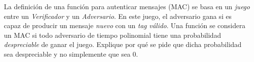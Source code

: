 La definición de una función para autenticar mensajes (MAC) se basa en un \emph{juego} entre un \emph{Verificador} y un \emph{Adversario}. En este juego, el adversario gana si es capaz de producir un mensaje \emph{nuevo} con un \emph{tag válido}. Una función se considera un MAC si todo adversario de tiempo polinomial tiene una probabilidad \emph{despreciable} de ganar el juego. Explique por qué se pide que dicha probabilidad sea despreciable y no simplemente que sea 0.
